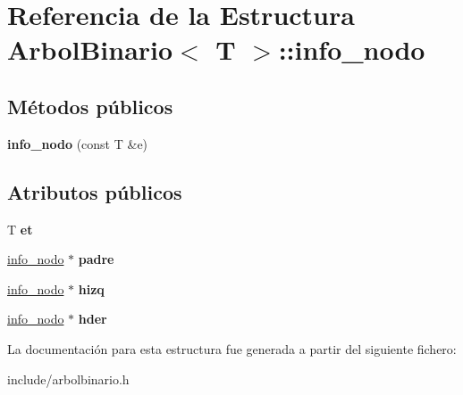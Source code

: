 \hypertarget{structArbolBinario_1_1info__nodo}{}\section{Referencia de la Estructura Arbol\+Binario$<$ T $>$\+:\+:info\+\_\+nodo}
\label{structArbolBinario_1_1info__nodo}
\subsection*{Métodos públicos}
\begin{DoxyCompactItemize}
\item 
\mbox{\label{structArbolBinario_1_1info__nodo_a298b155ece6a61d935469b0f9071505d}} 
{\bfseries info\+\_\+nodo} (const T \&e)
\end{DoxyCompactItemize}
\subsection*{Atributos públicos}
\begin{DoxyCompactItemize}
\item 
\mbox{\label{structArbolBinario_1_1info__nodo_ac010219cb5ca20e2e25530839aca587a}} 
T {\bfseries et}
\item 
\mbox{\label{structArbolBinario_1_1info__nodo_adc97502851c4fbf79e63c8f5ff51f9d5}} 
\hyperlink{structArbolBinario_1_1info__nodo}{info\+\_\+nodo} $\ast$ {\bfseries padre}
\item 
\mbox{\label{structArbolBinario_1_1info__nodo_ad99755f4fec90f1b32c4d60ec88a7856}} 
\hyperlink{structArbolBinario_1_1info__nodo}{info\+\_\+nodo} $\ast$ {\bfseries hizq}
\item 
\mbox{\label{structArbolBinario_1_1info__nodo_af05a633561cd318185f16b1e5006f0da}} 
\hyperlink{structArbolBinario_1_1info__nodo}{info\+\_\+nodo} $\ast$ {\bfseries hder}
\end{DoxyCompactItemize}


La documentación para esta estructura fue generada a partir del siguiente fichero\+:\begin{DoxyCompactItemize}
\item 
include/arbolbinario.\+h\end{DoxyCompactItemize}
